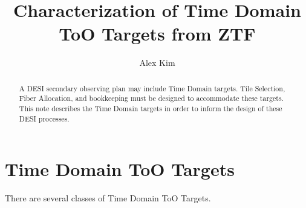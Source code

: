 \documentclass[11pt]{article}   	%
\begin{document}
\title{Characterization of Time Domain ToO Targets from ZTF}
\author{Alex Kim}
\date{}							%
\maketitle
\begin{abstract}
A DESI secondary observing plan may include Time Domain targets.  Tile Selection, Fiber Allocation, and bookkeeping must be
designed to accommodate these targets.  This note describes the Time Domain targets in order to inform the design
of these DESI processes.
\end{abstract}

\section{Time Domain ToO Targets}
There are several classes of Time Domain ToO Targets.  
\end{document}
